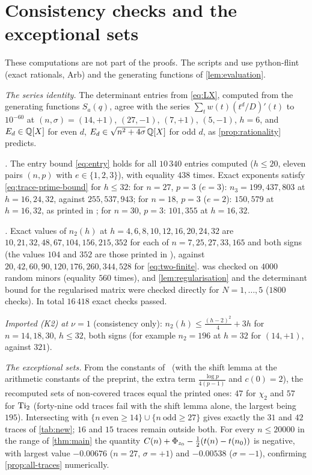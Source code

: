 \section{Consistency checks and the exceptional sets}\label{app:consistency}

\sloppy
These computations are not part of the proofs. The scripts  and  use
python-flint (exact rationals, Arb) and the generating functions of \cref{lem:evaluation}.

\emph{The series identity.} The determinant entries from \eqref{eq:LX}, computed from the generating functions
$S_a(q)$, agree with the series $\sum_t w(t)(t^{d}/D)'(t)$ to $10^{-60}$ at $(n,\sigma)=(14,+1)$, $(27,-1)$, $(7,+1)$, $(5,-1)$, $h=6$,
and $E_d\in\mathbb{Q}[X]$ for even $d$, $E_d\in\sqrt{n^2+4\sigma}\,\mathbb{Q}[X]$ for odd $d$, as \cref{prop:rationality} predicts.

\emph{.} The entry bound \eqref{eq:entry} holds for all $10\,340$ entries computed
($h\le20$, eleven pairs $(n,p)$ with $e\in\{1,2,3\}$), with equality $438$ times. Exact exponents satisfy
\eqref{eq:trace-prime-bound} for $h\le32$: for $n=27$, $p=3$ ($e=3$): $n_3=199,437,803$ at $h=16,24,32$, against
$255,537,943$; for $n=18$, $p=3$ ($e=2$): $150,579$ at $h=16,32$, as printed in \cite[after Lemma~3.8]{Krisman2026units};
for $n=30$, $p=3$: $101,355$ at $h=16,32$.

\emph{.} Exact values of $n_2(h)$ at $h=4,6,8,10,12,16,20,24,32$ are $10,21,32,48,67,104,156,215,352$
for each of $n=7,25,27,33,165$ and both signs (the values $104$ and $352$ are those printed in \cite[Section~8.1]{Krisman2026units}),
against $20,42,60,90,120,176,260,344,528$ for \eqref{eq:two-finite}.  was checked on $4000$ random
minors (equality $560$ times), and \cref{lem:regularisation} and the determinant bound for the regularised matrix were
checked directly for $N=1,\dots,5$ ($1800$ checks). In total $16\,418$ exact checks passed.

\emph{Imported (K2) at $\nu=1$} (consistency only): $n_2(h)\le\frac{(h-2)^2}4+3h$ for $n=14,18,30$, $h\le32$, both signs
(for example $n_2=196$ at $h=32$ for $(14,+1)$, against $321$).

\emph{The exceptional sets.} From the constants of~\Kri{} (with the shift lemma at the arithmetic constants of the preprint,
the extra term $\frac{\log p}{4(p-1)}$ and $c(0)=2$), the recomputed sets of non-covered traces equal the printed ones: $47$ for $\chi_2$ and $57$ for $\operatorname{Ti}_2$
(forty-nine odd traces fail with the shift lemma alone, the largest being $195$). Intersecting with $\{n\ \text{even}\ge14\}\cup\{n\ \mathrm{odd}\ge27\}$ gives exactly
the $31$ and $42$ traces of \cref{tab:new}; $16$ and $15$ traces remain outside both. For every $n\le20000$ in the range of
\cref{thm:main} the quantity $C(n)+\Phi_{z_0}-\frac12(t(n)-t(n_0))$ is negative, with largest value $-0.00676$
($n=27$, $\sigma=+1$) and $-0.00538$ ($\sigma=-1$), confirming \cref{prop:all-traces} numerically.
